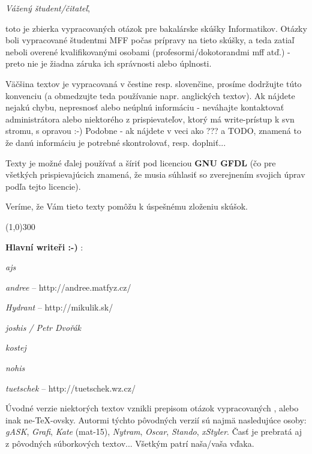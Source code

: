\emph{Vážený študent/čitateľ},

toto je zbierka vypracovaných otázok pre bakalárske skúšky Informatikov. Otáz\-ky boli vypracované študentmi MFF počas prípravy na tieto skúšky, a teda zatiaľ neboli overené kvalifikovanými osobami (profesormi/dokotorandmi mff atď.) - preto nie je žiadna záruka ich správnosti alebo úplnosti.

Väčšina textov je vypracovaná v čestine resp. slovenčine, prosíme dodržujte túto konvenciu (a obmedzujte teda používanie napr. anglických textov). Ak nájdete nejakú chybu, nepresnosť alebo neúplnú informáciu - neváhajte kontaktovať administrátora alebo niektorého z prispievateľov, ktorý má write-prístup k svn stromu, s opravou :-) Podobne - ak nájdete v  veci ako ??? a TODO, znamená to že danú informáciu je potrebné skontrolovať, resp. doplniť...

Texty je možné ďalej používať a šíriť pod licenciou \textbf{GNU GFDL} (čo pre všetkých prispievajúcich znamená, že musia súhlasiť so zverejnením svojich úprav podľa tejto licencie).

Veríme, že Vám tieto texty pomôžu k úspešnému zloženiu skúšok.

\begin{center}
\line(1,0){300}
\end{center}

\textbf{Hlavní writeři :-) }:
\begin{pitemize}
	\item \emph{ajs}
	\item \emph{andree} -- http://andree.matfyz.cz/
	\item \emph{Hydrant} -- http://mikulik.sk/
	\item \emph{joshis / Petr Dvořák}
	\item \emph{kostej}
	\item \emph{nohis}
	\item \emph{tuetschek} -- http://tuetschek.wz.cz/
\end{pitemize}

Úvodné verzie niektorých textov vznikli prepisom otázok vypracovaných , alebo inak ne-{\TeX}-ovsky. Autormi týchto pôvodných verzií sú najmä nasledujúce osoby:
\emph{gASK}, \emph{Grafi}, \emph{Kate} (mat-15), \emph{Nytram}, \emph{Oscar}, \emph{Stando}, \emph{xStyler}. Časť je prebratá aj z pôvodných súborkových textov...
Všetkým patrí naša/vaša vďaka.
